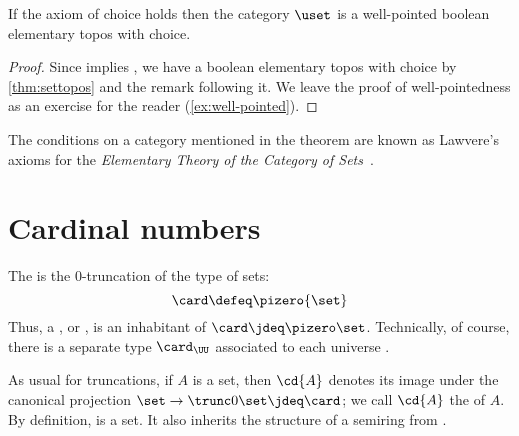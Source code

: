 \begin{thm}\label{thm:ETCS}
  If the axiom of choice holds then the category $\uset$ is a well-pointed boolean elementary topos with choice.
\end{thm}

\begin{proof}
  Since \choice{} implies \LEM{}, we have a boolean elementary topos with choice by \cref{thm:settopos} and the remark following it.  We leave the proof of well-pointedness as
an exercise for the reader (\cref{ex:well-pointed}).
\end{proof}

\begin{rmk}
  The conditions on a category mentioned in the theorem are known as Lawvere's
  axioms for the \emph{Elementary Theory of the Category of Sets}~\cite{lawvere:etcs-long}.
\end{rmk}

\section{Cardinal numbers}
\label{sec:cardinals}

\begin{defn}\label{defn:card}
  The 
  is the 0-truncation of the type \set of sets:
  \[ \card \defeq \pizero{\set} \]
  Thus, a , or , is an inhabitant of $\card\jdeq \pizero\set$.
  Technically, of course, there is a separate type $\card_\UU$ associated to each universe \type.
\end{defn}



As usual for truncations, if $A$ is a set, then $\cd{A}$ denotes its image under the canonical projection $\set \to \trunc0\set \jdeq \card$; we call $\cd{A}$ the  of $A$.
By definition, \card is a set.
It also inherits the structure of a semiring from \set.


